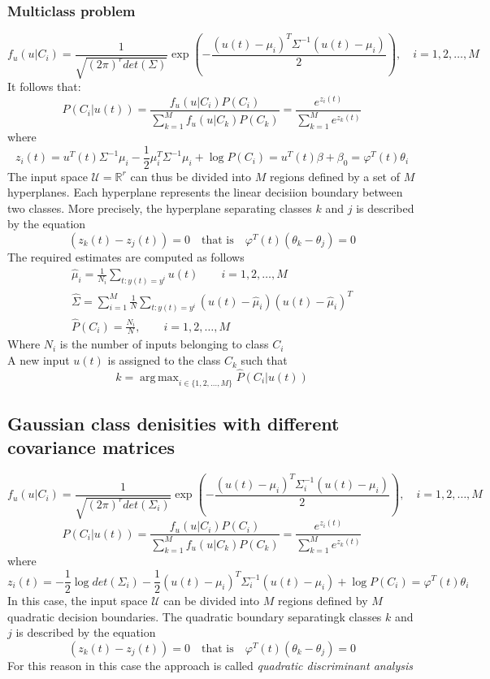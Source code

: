 \documentclass{book}
\DeclareMathOperator*{\argmax}{arg\,max}
\theoremstyle{definition}
\theoremstyle{remark}
\theoremstyle{remark}
\begin{document}
\subsubsection{Multiclass problem}
\[
    f_u(u|C_i)=\displaystyle\frac{1}{\sqrt{(2\pi)^rdet(\Sigma)}}\exp \left(-\displaystyle\frac{(u(t)-\mu_i)^T\Sigma^{-1}(u(t)-\mu_i)}{2}\right), \quad i=1,2,\dots,M
\]
It follows that: 
\[
    P(C_i|u(t)) = \displaystyle\frac{f_u(u|C_i)P(C_i)}{\sum_{k=1}^{M}f_u(u|C_k)P(C_k)}=\displaystyle\frac{e^{z_i(t)}}{\sum_{k=1}^{M}e^{z_k(t)}}
\]
where 
\[
    z_i(t) = u^T(t)\Sigma^{-1}\mu_i - \displaystyle\frac{1}{2}\mu_i^T\Sigma^{-1}\mu_i + \log P(C_i) = u^T(t)\beta+\beta_0 = \varphi^T(t)\theta_i
\]
The input space $\mathcal{U}=\mathbb{R}^r$ can thus be divided into $M$ regions defined by a set of $M$ hyperplanes. Each hyperplane represents the linear decisiion boundary between two classes. More precisely, the hyperplane separating classes $k$ and $j$ is described by the equation 
\[
    (z_k(t)-z_j(t))=0 \quad \text{that is} \quad \varphi^T(t)(\theta_k-\theta_j)=0
\]
The required estimates are computed as follows 
\begin{gather*}
    \hat{\mu}_i = \displaystyle\frac{1}{N_i}\displaystyle\sum_{t:y(t)=y^i}u(t)  \qquad i=1,2,\dots,M\\
    \hat{\Sigma}=\displaystyle\sum_{i=1}^{M}\displaystyle\frac{1}{N}\displaystyle\sum_{t:y(t)=y^i}(u(t)-\hat{\mu}_i)(u(t)-\hat{\mu}_i)^T\\
    \hat{P}(C_i) = \displaystyle\frac{N_i}{N}, \qquad i=1,2,\dots,M
\end{gather*}
Where $N_i$ is the number of inputs belonging to class $C_i$\\
A new input $u(t)$ is assigned to the class $C_k$ such that 
\[
    k=\argmax_{i\in\{1,2,\dots,M\}}\hat{P}(C_i|u(t))
\]
\subsection{Gaussian class denisities with different covariance matrices}
\[
    f_u(u|C_i)=\displaystyle\frac{1}{\sqrt{(2\pi)^rdet(\Sigma_i)}}\exp \left(-\displaystyle\frac{(u(t)-\mu_i)^T\Sigma_i^{-1}(u(t)-\mu_i)}{2}\right), \quad i=1,2,\dots,M
\]
\[
    P(C_i|u(t)) = \displaystyle\frac{f_u(u|C_i)P(C_i)}{\sum_{k=1}^{M}f_u(u|C_k)P(C_k)}=\displaystyle\frac{e^{z_i(t)}}{\sum_{k=1}^{M}e^{z_k(t)}}
\]
where
\[
    z_i(t) = -\displaystyle\frac{1}{2}\log det(\Sigma_i) - \displaystyle\frac{1}{2}(u(t)-\mu_i)^T\Sigma_i^{-1}(u(t)-\mu_i) + \log P(C_i) = \varphi^T(t)\theta_i
\]
In this case, the input space $\mathcal{U}$ can be divided into $M$ regions defined by $M$ quadratic decision boundaries. The quadratic boundary separatingk classes $k$ and $j$ is described by the equation 
\[
    (z_k(t)-z_j(t))=0 \quad \text{that is} \quad \varphi^T(t)(\theta_k-\theta_j)=0
\]
For this reason in this case the approach is called \emph{quadratic discriminant analysis}
\end{document}
